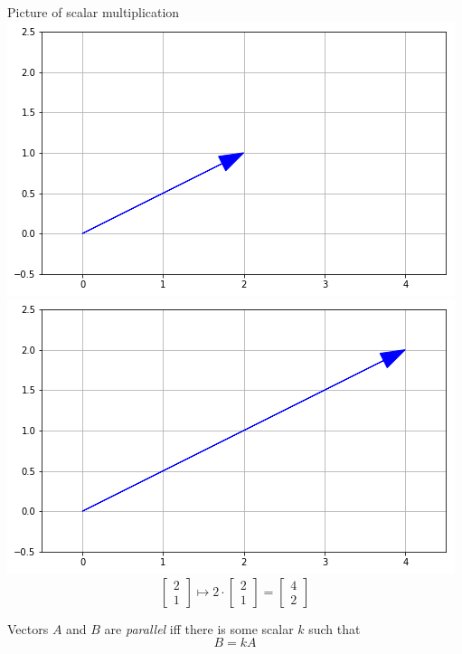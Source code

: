 \documentclass{beamer}
\begin{document}
\begin{frame}{Picture of scalar multiplication}
  \includegraphics[scale=0.3]{scalarbefore.png}
  \includegraphics[scale=0.3]{scalarafter.png}\\
  \begin{equation*}
    \left[
      \begin{array}{c}
        2\\
        1
      \end{array}
    \right]\mapsto
    2\cdot\left[
      \begin{array}{c}
        2\\
        1
      \end{array}
    \right] = \left[
      \begin{array}{c}
        4\\
        2
      \end{array}
    \right]
  \end{equation*}
  \begin{definition}
    Vectors $A$ and $B$ are \emph{parallel} iff there is some scalar $k$ such that
    \begin{equation*}
      B = kA
    \end{equation*}
  \end{definition}
\end{frame}
\end{document}
